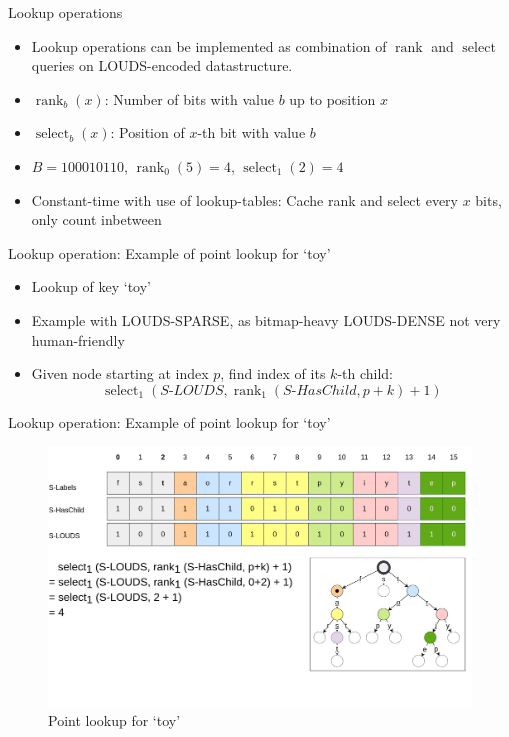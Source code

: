 \documentclass{beamer}
\begin{document}
\begin{frame}{Lookup operations}
		\begin{itemize}
				\item Lookup operations can be implemented as combination of
						$\operatorname{rank}$ and $\operatorname{select}$
						queries on LOUDS-encoded datastructure.
				\item $\operatorname{rank}_b(x)$: Number of bits with value $b$
						up to position $x$
				\item $\operatorname{select}_b(x)$: Position of $x$-th bit with value $b$
				\item $B = 100010110$, $\operatorname{rank}_0(5) = 4$,
						$\operatorname{select}_1(2) = 4$
				\item Constant-time with use of lookup-tables: Cache rank and
						select every $x$ bits, only count inbetween
		\end{itemize}
\end{frame}

\begin{frame}{Lookup operation: Example of point lookup for `toy'}
		\begin{itemize}
				\item Lookup of key `toy'
				\item Example with LOUDS-SPARSE, as bitmap-heavy LOUDS-DENSE not
						very human-friendly
				\item Given node starting at index $p$, find index of its $k$-th child:
						\[
								\operatorname{select}_1(S\text{-}LOUDS, \operatorname{rank}_1(S\text{-}HasChild, p+k) + 1)
						\]
		\end{itemize}
\end{frame}

\begin{frame}{Lookup operation: Example of point lookup for `toy'}
		\begin{figure}
				\centering
				\includegraphics[width=\textwidth]{resources/surf_point_lookup_1}
				\caption{Point lookup for `toy'}
		\end{figure}
\end{frame}
\end{document}

